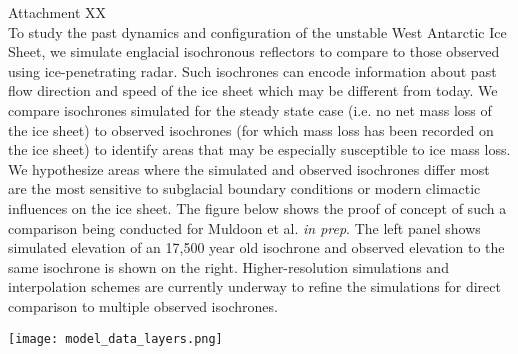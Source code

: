 \documentclass[]{article}
\begin{document}
\noindent
Attachment XX
\\

To study the past dynamics and configuration of the unstable West Antarctic Ice Sheet, we simulate englacial isochronous reflectors to compare to those observed using ice-penetrating radar. Such isochrones can encode information about past flow direction and speed of the ice sheet which may be different from today. We compare isochrones simulated for the steady state case (i.e. no net mass loss of the ice sheet) to observed isochrones (for which mass loss has been recorded on the ice sheet) to identify areas that may be especially susceptible to ice mass loss. We hypothesize areas where the simulated and observed isochrones differ most are the most sensitive to subglacial boundary conditions or modern climactic influences on the ice sheet. The figure below shows the proof of concept of such a comparison being conducted for Muldoon et al. \textit{in prep}. The left panel shows simulated elevation of an 17,500 year old isochrone and observed elevation to the same isochrone is shown on the right. Higher-resolution simulations and interpolation schemes are currently underway to refine the simulations for direct comparison to multiple observed isochrones.

\begin{figure*}[h]
\begin{center}
\texttt{[image: model\_data\_layers.png]}
\end{center}
\end{figure*}
\end{document}
